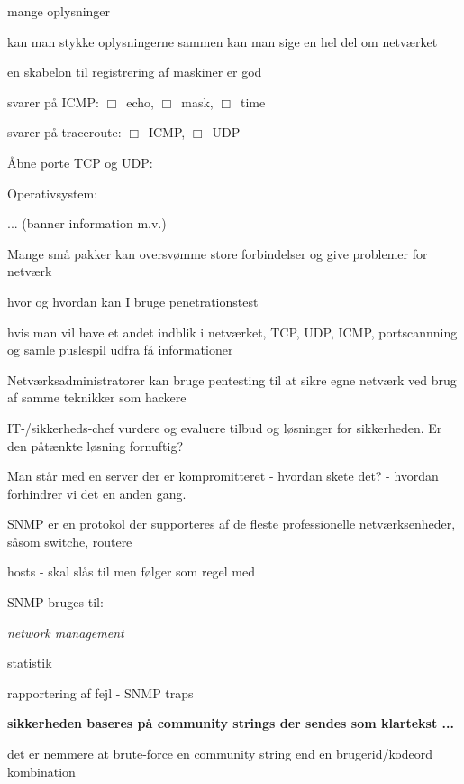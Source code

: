 \documentclass[20pt,landscape,a4paper,footrule]{foils}
\begin{document}

\begin{list1}
  \item mange oplysninger
\item kan man stykke oplysningerne sammen kan man sige en hel del om
  netværket 
\item en skabelon til registrering af maskiner er god
  \begin{list2}
    \item svarer på ICMP: $\Box$\  echo, $\Box$\ mask, $\Box$\ time
\item svarer på traceroute: $\Box$\ ICMP, $\Box$\ UDP
\item Åbne porte TCP og UDP: 
\item Operativsystem:
\item ... (banner information m.v.)
  \end{list2}
\item Mange små pakker kan oversvømme store forbindelser og
  give problemer for netværk
\end{list1}



\begin{list1}
\item hvor og hvordan kan I bruge penetrationstest
\item hvis man vil have et andet indblik i netværket, TCP, UDP, ICMP,
  portscannning og samle puslespil udfra få informationer 
\item Netværksadministratorer kan bruge pentesting til at sikre egne
  netværk ved brug af samme teknikker som hackere
\item IT-/sikkerheds-chef vurdere og evaluere tilbud og løsninger for
  sikkerheden. Er den påtænkte løsning fornuftig?
\item Man står med en server der er kompromitteret - hvordan skete
  det? - hvordan forhindrer vi det en anden gang. 
\end{list1}






\begin{list1}
\item SNMP er en protokol der supporteres af de fleste professionelle
  netværksenheder, såsom switche, routere
\item hosts - skal slås til men følger som regel med
\item SNMP bruges til: 
  \begin{list2}
    \item \emph{network management}
    \item statistik
    \item rapportering af fejl - SNMP traps
  \end{list2}
\item {\bfseries sikkerheden baseres på community strings der sendes
    som klartekst ...}
\item det er nemmere at brute-force en community string end en
  brugerid/kodeord kombination
\end{list1}
\end{document}
